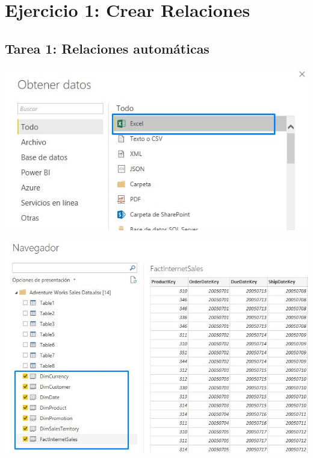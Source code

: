 \section{Ejercicio 1: Crear Relaciones}
\subsection{Tarea 1: Relaciones automáticas}

\begin{center}
\includegraphics[width=\columnwidth]{images/task1/task1-01}\newline
\end{center}

\begin{center}
\includegraphics[width=\columnwidth]{images/task1/task1-02}\newline
\end{center}

